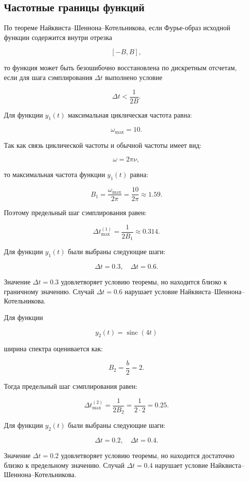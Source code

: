 \documentclass[a4paper, 12pt]{article}
\begin{document}
\subsection{Частотные границы функций}

По теореме Найквиста--Шеннона--Котельникова, если Фурье-образ исходной функции содержится внутри отрезка

\[
[-B,B],
\]

то функция может быть безошибочно восстановлена по дискретным отсчетам, если для шага сэмплирования \(\Delta t\) выполнено условие

\[
\Delta t < \frac{1}{2B}.
\]

Для функции \(y_1(t)\) максимальная циклическая частота равна:

\[
\omega_{\max}=10.
\]

Так как связь циклической частоты и обычной частоты имеет вид:

\[
\omega=2\pi\nu,
\]

то максимальная частота функции \(y_1(t)\) равна:

\[
B_1=\frac{\omega_{\max}}{2\pi}
=
\frac{10}{2\pi}
\approx 1.59.
\]

Поэтому предельный шаг сэмплирования равен:

\[
\Delta t_{\max}^{(1)}
=
\frac{1}{2B_1}
\approx 0.314.
\]

Для функции \(y_1(t)\) были выбраны следующие шаги:

\[
\Delta t=0.3,\quad \Delta t=0.6.
\]

Значение \(\Delta t=0.3\) удовлетворяет условию теоремы, но находится близко к граничному значению. Случай \(\Delta t=0.6\) нарушает условие Найквиста--Шеннона--Котельникова.

Для функции

\[
y_2(t)=\operatorname{sinc}(4t)
\]

ширина спектра оценивается как:

\[
B_2=\frac{b}{2}=2.
\]

Тогда предельный шаг сэмплирования равен:

\[
\Delta t_{\max}^{(2)}
=
\frac{1}{2B_2}
=
\frac{1}{2\cdot 2}
=
0.25.
\]

Для функции \(y_2(t)\) были выбраны следующие шаги:

\[
\Delta t=0.2,\quad \Delta t=0.4.
\]

Значение \(\Delta t=0.2\) удовлетворяет условию теоремы, но находится достаточно близко к предельному значению. Случай \(\Delta t=0.4\) нарушает условие Найквиста--Шеннона--Котельникова.
\end{document}
